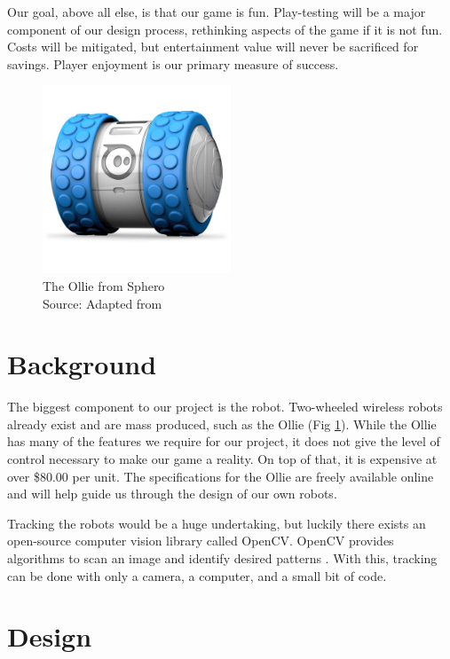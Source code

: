 \documentclass[11pt]{ieeeconf}
\begin{document}
Our goal, above all else, is that our game is fun. Play-testing will be a major component of our design process, rethinking aspects of the game if it is not fun. Costs will be mitigated, but entertainment value will never be sacrificed for savings. Player enjoyment is our primary measure of success.

\begin{figure}[H]
\centering
\captionsetup{justification=centering}
\includegraphics[width=0.5\textwidth]{images/SumoBot.png}
\caption{The Ollie from Sphero\\Source: Adapted from \cite{ollie:19}}
\label{Ollie}
\end{figure}

\section{Background}

The biggest component to our project is the robot. Two-wheeled wireless robots already exist and are mass produced, such as the Ollie (Fig \ref{Ollie}). While the Ollie has many of the features we require for our project, it does not give the level of control necessary to make our game a reality. On top of that, it is expensive at over \$80.00 per unit. The specifications for the Ollie are freely available online and will help guide us through the design of our own robots.

Tracking the robots would be a huge undertaking, but luckily there exists an open-source computer vision library called OpenCV. OpenCV provides algorithms to scan an image and identify desired patterns \cite{opencv:19}. With this, tracking can be done with only a camera, a computer, and a small bit of code. 

\section{Design}
\end{document}
